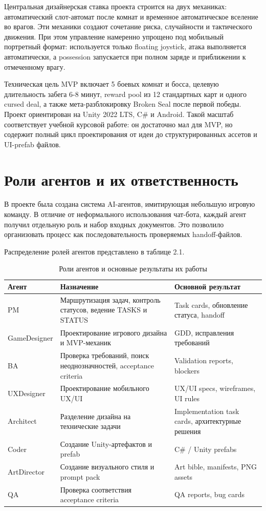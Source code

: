 \documentclass[a4paper,12pt]{report}
\begin{document}
Центральная дизайнерская ставка проекта строится на двух механиках: автоматический слот-автомат после комнат и временное автоматическое вселение во врагов. Эти механики создают сочетание риска, случайности и тактического движения. При этом управление намеренно упрощено под мобильный портретный формат: используется только floating joystick, атака выполняется автоматически, а possession запускается при полном заряде и приближении к отмеченному врагу.

Техническая цель MVP включает 5 боевых комнат и босса, целевую длительность забега 6-8 минут, reward pool из 12 стандартных карт и одного cursed deal, а также мета-разблокировку Broken Seal после первой победы. Проект ориентирован на Unity 2022 LTS, C\# и Android. Такой масштаб соответствует учебной курсовой работе: он достаточно мал для MVP, но содержит полный цикл проектирования от идеи до структурированных ассетов и UI-prefab файлов.

\section{Роли агентов и их ответственность}

В проекте была создана система AI-агентов, имитирующая небольшую игровую команду. В отличие от неформального использования чат-бота, каждый агент получил отдельную роль и набор входных документов. Это позволило организовать процесс как последовательность проверяемых handoff-файлов.

Распределение ролей агентов представлено в таблице 2.1.

\begin{table}[H]
\centering
\caption{Роли агентов и основные результаты их работы}
\small
\begin{tabularx}{\textwidth}{@{}p{}Y Y@{}}
\toprule
\textbf{Агент} & \textbf{Назначение} & \textbf{Основной результат} \\
\midrule
PM & Маршрутизация задач, контроль статусов, ведение TASKS и STATUS & Task cards, обновление статуса, handoff \\
GameDesigner & Проектирование игрового дизайна и MVP-механик & GDD, исправления требований \\
BA & Проверка требований, поиск неоднозначностей, acceptance criteria & Validation reports, blockers \\
UXDesigner & Проектирование мобильного UX/UI & UX/UI specs, wireframes, UI rules \\
Architect & Разделение дизайна на технические задачи & Implementation task cards, архитектурные решения \\
Coder & Создание Unity-артефактов и prefab & C\# / Unity prefabs \\
ArtDirector & Создание визуального стиля и prompt pack & Art bible, manifests, PNG assets \\
QA & Проверка соответствия acceptance criteria & QA reports, bug cards \\
\bottomrule
\end{tabularx}
\end{table}
\end{document}
